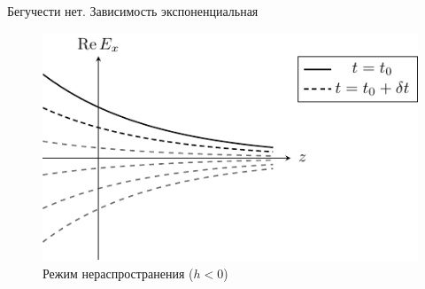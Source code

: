 \documentclass[a4paper,14pt]{extarticle}
\begin{document}
Бегучести нет.
Зависимость экспоненциальная
\begin{figure}[h!]
	\centering
	\includegraphics[scale=1]{img/lect3_ris2}
	\caption{Режим нераспространения ($h<0$)}
	\label{fig:lect3:2}
\end{figure}
\end{document}
